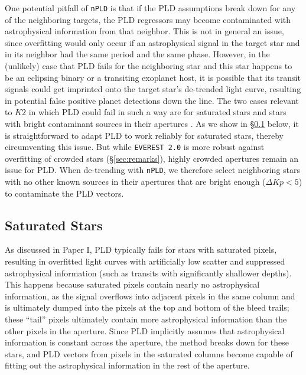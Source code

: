 \documentclass[]{emulateapj}
\newcommand{\Kp}{\ensuremath{Kp}}
\begin{document}
One potential pitfall of \texttt{nPLD} is that if the PLD assumptions break down for
any of the neighboring targets, the PLD regressors may become contaminated with
astrophysical information from that neighbor. This is not in general an issue, since
overfitting would only occur if an astrophysical signal in the target star and in
its neighbor had the same period and the same phase. However, in the (unlikely) case
that PLD fails for the neighboring star and this star happens to be an eclipsing binary
or a transiting exoplanet host, it is possible that its transit signals could get imprinted onto
the target star's de-trended light curve, resulting in potential false positive planet
detections down the line. The two cases relevant to $K2$ in which PLD could fail in such
a way are for saturated stars and stars with bright contaminant sources in their
apertures \citep{Luger16}. As we show in \S\ref{sec:impl_saturated} below, it is
straightforward to adapt PLD to work reliably for saturated stars, thereby circumventing
this issue. But while
\texttt{EVEREST 2.0} is more robust against overfitting of crowded stars
(\S\ref{sec:remarks}), highly crowded apertures remain an issue for PLD. When de-trending
with \texttt{nPLD}, we therefore select neighboring stars with no other known sources
in their apertures that are bright enough ($\Delta \Kp < 5$) to contaminate the PLD
vectors.

\subsection{Saturated Stars}
\label{sec:impl_saturated}
As discussed in Paper I, PLD typically fails for stars with saturated pixels, resulting
in overfitted light curves with artificially low scatter and suppressed astrophysical
information (such as transits with significantly shallower depths). This happens because
saturated pixels contain nearly no astrophysical information, as the signal
overflows into adjacent pixels in the same column and is ultimately dumped into the
pixels at the top and bottom of the bleed trails; these ``tail'' pixels ultimately contain more
astrophysical information than the other pixels in the aperture. Since PLD implicitly
assumes that astrophysical information is constant across the aperture, the method
breaks down for these stars, and PLD vectors from pixels in the saturated columns become capable
of fitting out the astrophysical information in the rest of the aperture.
\end{document}
